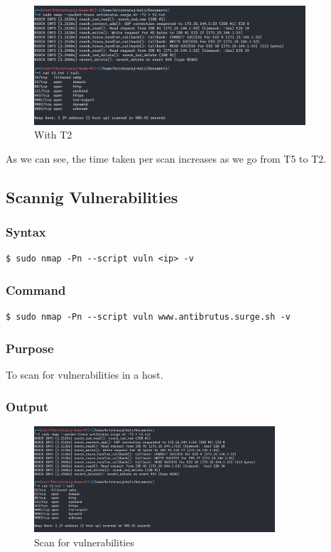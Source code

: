 \documentclass[11pt]{article}
\begin{document}
\begin{figure}[H]
    \centering
    \includegraphics[width=0.9\textwidth]{t2.png}
    \caption{With T2}
    \label{fig:1}
\end{figure}

As we can see, the time taken per scan increases as we go from T5 to T2.


\subsection{Scannig Vulnerabilities}
\subsubsection{Syntax}
\begin{verbatim}
$ sudo nmap -Pn --script vuln <ip> -v
\end{verbatim}

\subsubsection*{Command}
\begin{verbatim}
$ sudo nmap -Pn --script vuln www.antibrutus.surge.sh -v
\end{verbatim}

\subsubsection*{Purpose}
To scan for vulnerabilities in a host.

\subsubsection*{Output}
\begin{figure}[H]
    \centering
    \includegraphics[width=0.8\textwidth]{vuln.png}
    \caption{Scan for vulnerabilities}
    \label{fig:1}
\end{figure}
\end{document}
